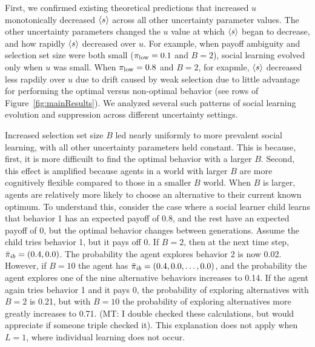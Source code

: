 \documentclass[letterpaper,11.5pt]{scrartcl}
\newcommand{\mt}[1]{{\textcolor{myorange} {({\tiny MT:} #1)}}}
\begin{document}
First, we confirmed existing theoretical predictions that increased $u$
monotonically decreased $\langle s \rangle$ across all other uncertainty parameter values.
The other uncertainty parameters changed the $u$ value at which $\langle s \rangle$
began to decrease, and how rapidly $\langle s \rangle$ decreased over $u$.  For example,
when payoff ambiguity and selection set size were both small ($\pi_{\mathrm{low}} = 0.1$
and $B=2$), social learning evolved only when $u$ was small. 
When $\pi_{\mathrm{low}} = 0.8$ and $B=2$, for exapmle, $\langle s \rangle$ decreased less rapdily
over $u$ due to drift caused by weak selection due to little advantage for
performing the optimal versus non-optimal behavior (see rows of
Figure~\ref{fig:mainResults}). We analyzed several such patterns of social
learning evolution and suppression across different uncertainty settings.

Increased selection set size $B$ led nearly uniformly to more prevalent social
learning, with all other uncertainty parameters held constant. This is because, first,
it is more difficuilt to find the optimal behavior with a larger $B$.  Second, this
effect is amplified because agents in a world with larger $B$ are more cognitively
flexible compared to those in a smaller $B$ world.  When $B$ is larger, agents are
relatively more likely to choose an alternative to their current known optimum.  To
understand this, consider the case where a social learner child learns that behavior 1
has an expected payoff of 0.8, and the rest have an expected payoff of 0, but the
optimal behavior changes between generations. Assume the child tries behavior 1, but
it pays off 0.  If $B=2$, then at the next time step, $\bar\pi_{ib} =
(0.4, 0.0)$. The probability the agent explores behavior 2 is now 0.02. However, if
$B=10$ the agent has $\bar\pi_{ib} = (0.4, 0.0, \ldots, 0.0)$, and the probability the agent
explores one of the nine alternative behaviors increases to 0.14.  If the agent again
tries behavior 1 and it pays 0, the probability of exploring alternatives with $B=2$
is 0.21, but with $B=10$ the probability of exploring alternatives more greatly increases
to 0.71. \mt{I double checked these calculations, but would appreciate if someone
  triple checked it}. 
This explanation does not apply when $L=1$, where individual learning does not occur. 
\end{document}
